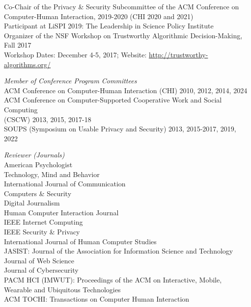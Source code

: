 \documentclass[9pt]{extarticle}
\begin{document}
\newpage

Co-Chair of the Privacy \& Security Subcommittee of the ACM Conference on \\
\hspace{0.5cm} Computer-Human Interaction, 2019-2020 (CHI 2020 and 2021) \\[1pt]
Participant at LiSPI 2019: The Leadership in Science Policy Institute \\[1pt]

Organizer of the NSF Workshop on Trustworthy Algorithmic Decision-Making, Fall 2017 \\[1pt]
\hspace{0.5cm} Workshop Dates: December 4-5, 2017; Website: \href{http://trustworthy-algorithms.org/}{http://trustworthy-algorithms.org/}

\emph{Member of Conference Program Committees} \\
\vspace{1pt}
ACM Conference on Computer-Human Interaction (CHI) 2010, 2012, 2014, 2024 \\
ACM Conference on Computer-Supported Cooperative Work and Social Computing \\
\hspace{0.5cm} (CSCW) 2013, 2015, 2017-18 \\
SOUPS (Symposium on Usable Privacy and Security) 2013, 2015-2017, 2019, 2022

\emph{Reviewer (Journals)} \\
\vspace{1pt}
American Psychologist \\
Technology, Mind and Behavior \\
International Journal of Communication \\
Computers \& Security \\ 
Digital Journalism \\
Human Computer Interaction Journal \\
IEEE Internet Computing \\
IEEE Security \& Privacy \\
International Journal of Human Computer Studies \\
JASIST: Journal of the Association for Information Science and Technology \\
Journal of Web Science \\
Journal of Cybersecurity \\ 
PACM HCI (IMWUT): Proceedings of the ACM on Interactive, Mobile, Wearable and Ubiquitous Technologies \\ 
ACM TOCHI: Transactions on Computer Human Interaction
\end{document}
